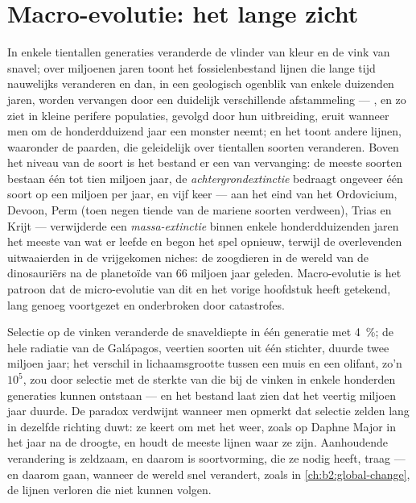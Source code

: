 \section{Macro-evolutie: het lange zicht}

\begin{proposition}\label{prop:b2:speciation:tempo}
In enkele tientallen generaties veranderde de vlinder van kleur en de vink van
snavel; over miljoenen jaren toont het fossielenbestand lijnen die lange tijd
nauwelijks veranderen en dan, in een geologisch ogenblik van enkele duizenden
jaren, worden vervangen door een duidelijk verschillende afstammeling ---
\emph{}, en zo ziet  in kleine
perifere populaties, gevolgd door hun uitbreiding, eruit wanneer men om de
honderdduizend jaar een monster neemt; en het toont andere lijnen, waaronder
de paarden, die geleidelijk over tientallen soorten veranderen. Boven het
niveau van de soort is het bestand er een van vervanging: de meeste soorten
bestaan één tot tien miljoen jaar, de \emph{achtergrondextinctie} bedraagt
ongeveer één soort op een miljoen per jaar, en vijf keer --- aan het eind van
het Ordovicium, Devoon, Perm (toen negen tiende van de mariene soorten
verdween), Trias en Krijt --- verwijderde een \emph{massa-extinctie} binnen
enkele honderdduizenden jaren het meeste van wat er leefde en begon het spel
opnieuw, terwijl de overlevenden uitwaaierden in de vrijgekomen niches: de
zoogdieren in de wereld van de dinosauriërs na de planetoïde van 66 miljoen
jaar geleden. Macro-evolutie is het patroon dat de micro-evolutie van dit en
het vorige hoofdstuk heeft getekend, lang genoeg voortgezet en onderbroken door
catastrofes.
\end{proposition}

\begin{example}\label{ex:b2:speciation:rates}
Selectie op de vinken veranderde de snaveldiepte in één generatie met
\qty{4}{\%}; de hele radiatie van de Galápagos, veertien soorten uit één
stichter, duurde twee miljoen jaar; het verschil in lichaamsgrootte tussen een
muis en een olifant, zo'n $10^{5}$, zou door selectie met de sterkte van die
bij de vinken in enkele honderden generaties kunnen ontstaan --- en het
bestand laat zien dat het veertig miljoen jaar duurde. De paradox verdwijnt
wanneer men opmerkt dat selectie zelden lang in dezelfde richting duwt: ze
keert om met het weer, zoals op Daphne Major in het jaar na de droogte, en
 houdt de meeste lijnen waar ze zijn. Aanhoudende
verandering is zeldzaam, en daarom is soortvorming, die ze nodig heeft, traag
--- en daarom gaan, wanneer de wereld snel verandert, zoals in
\cref{ch:b2:global-change}, de lijnen verloren die niet kunnen volgen.
\end{example}

